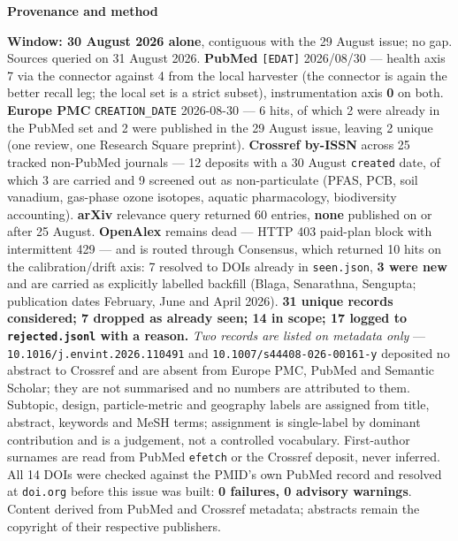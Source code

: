 \documentclass[10pt]{article}
\begin{document}


\vspace{4mm}
\begin{keybox}
{\sffamily\bfseries\footnotesize\color{Deep}Provenance and method}\\[1.2mm]
{\fontsize{7.2}{8.8}\selectfont
\textbf{Window: 30 August 2026 alone}, contiguous with the 29 August issue; no gap.
Sources queried on 31 August 2026. \textbf{PubMed} \texttt{[EDAT]} 2026/08/30 --- health
axis 7 via the connector against 4 from the local harvester (the connector is again the
better recall leg; the local set is a strict subset), instrumentation axis \textbf{0} on
both. \textbf{Europe PMC} \texttt{CREATION\_DATE} 2026-08-30 --- 6 hits, of which 2 were
already in the PubMed set and 2 were published in the 29 August issue, leaving 2 unique
(one review, one Research Square preprint). \textbf{Crossref by-ISSN} across 25 tracked
non-PubMed journals --- 12 deposits with a 30 August \texttt{created} date, of which 3 are
carried and 9 screened out as non-particulate (PFAS, PCB, soil vanadium, gas-phase ozone
isotopes, aquatic pharmacology, biodiversity accounting). \textbf{arXiv} relevance query
returned 60 entries, \textbf{none} published on or after 25 August. \textbf{OpenAlex}
remains dead --- HTTP 403 paid-plan block with intermittent 429 --- and is routed through
Consensus, which returned 10 hits on the calibration/drift axis: 7 resolved to DOIs already
in \texttt{seen.json}, \textbf{3 were new} and are carried as explicitly labelled backfill
(Blaga, Senarathna, Sengupta; publication dates February, June and April 2026).
\textbf{31 unique records considered; 7 dropped as already seen; 14 in scope; 17 logged to
\texttt{rejected.jsonl} with a reason.}
\emph{Two records are listed on metadata only} --- \texttt{10.1016/j.envint.2026.110491} and
\texttt{10.1007/s44408-026-00161-y} deposited no abstract to Crossref and are absent from
Europe PMC, PubMed and Semantic Scholar; they are not summarised and no numbers are
attributed to them.
Subtopic, design, particle-metric and geography labels are assigned from title, abstract,
keywords and MeSH terms; assignment is single-label by dominant contribution and is a
judgement, not a controlled vocabulary. First-author surnames are read from PubMed
\texttt{efetch} or the Crossref deposit, never inferred.
All 14 DOIs were checked against the PMID's own PubMed record and resolved at
\texttt{doi.org} before this issue was built: \textbf{0 failures, 0 advisory warnings}.
Content derived from PubMed and Crossref metadata; abstracts remain the copyright of their
respective publishers.\par}
\end{keybox}
\end{document}
